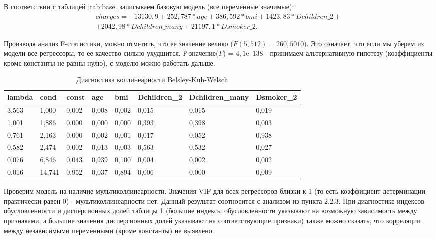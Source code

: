 \documentclass[a4paper,12pt]{article}
\begin{document}
В соответствии с таблицей \ref{tab:base} записываем базовую модель (все переменные значимые):
\begin{align*}
charges = -13130,9 + 252,787 * age + 386,592 * bmi + 1423,83 * Dchildren\_2 + \\ + 2042,98 * Dchildren\_many + 21197,1 * Dsmoker\_2.
\end{align*}

Производя анализ F-статистики, можно отметить, что ее значение велико ($F(5, 512) = 260,5010$). Это означает, что если мы уберем из модели все регрессоры, то ее качество сильно ухудшится. Р-значение($F$) = $4,1\textrm{e--138}$ - принимаем альтернативную гипотезу (коэффициенты кроме константы не равны нулю), с моделю можно работать дальше.

\begin{table}[H]
	\begin{tabular}{|l|l|l|l|l|l|l|l|}
		\hline
		lambda & cond   & const & age   & bmi   & Dchildren\_2 & Dchildren\_many & Dsmoker\_2 \\ \hline
		3,563  & 1,000  & 0,002 & 0,008 & 0,002 & 0,015        & 0,015           & 0,019      \\ \hline
		1,001  & 1,886  & 0,000 & 0,000 & 0,000 & 0,393        & 0,398           & 0,003      \\ \hline
		0,761  & 2,163  & 0,000 & 0,002 & 0,001 & 0,017        & 0,052           & 0,938      \\ \hline
		0,582  & 2,474  & 0,002 & 0,013 & 0,003 & 0,563        & 0,532           & 0,027      \\ \hline
		0,076  & 6,846  & 0,043 & 0,939 & 0,100 & 0,004        & 0,002           & 0,002      \\ \hline
		0,016  & 14,741 & 0,952 & 0,037 & 0,894 & 0,006        & 0,000           & 0,009      \\ \hline
	\end{tabular}
\caption{Диагностика коллинеарности Belsley-Kuh-Welsch}
\label{tab:base_bkw}
\end{table}

Проверим модель на наличие мультиколлинеарности. Значения VIF для всех регрессоров близки к 1 (то есть коэффициент детерминации практически равен 0) - мультиколлинеарности нет. Данный результат соотносится с анализом из пункта 2.2.3. При диагностике индексов обусловленности и дисперсионных долей таблицы \ref{tab:base_bkw} (большие индексы обусловленности указывают на возможную зависимость между признаками, а большие значения дисперсионных долей указывают на соответствующие признаки) также можно сказать, что корреляции между независимыми переменными (кроме константы) не выявлено.
\end{document}
